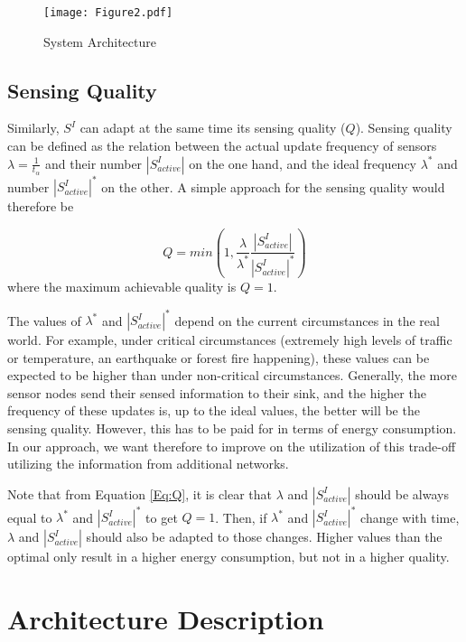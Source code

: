 \documentclass[onecolumn]{jaise2e}
\begin{document}
\begin{figure*}[!th]
\centering
\texttt{[image: Figure2.pdf]}  
\caption{System Architecture}
\label{fig:System_Architecture}
\end{figure*}


\subsection{Sensing Quality}

Similarly, $S^I$ can adapt at the same time its sensing quality ($Q$). Sensing quality can be defined as the relation between the actual update frequency of sensors $\lambda = \frac{1}{t_\alpha}$ and their number $|S^{I}_{active}|$ on the one hand, and the ideal frequency $\lambda^{\ast}$ and number $|S^{I}_{active}|^{\ast}$ on the other. A simple approach for the sensing quality would therefore be

\begin{equation}\label{Eq:Q}
Q = min \left(1, \frac{\lambda}{\lambda^{\ast}} \frac{|S^{I}_{active}|}{|S^{I}_{active}|^{\ast}}\right)
\end{equation}
where the maximum achievable quality is $Q=1$. 

The values of $\lambda^{\ast}$ and $|S^{I}_{active}|^{\ast}$ depend on the current circumstances in the real world. For example, under critical circumstances (extremely high levels of traffic or temperature, an earthquake or forest fire happening), these values can be expected to be higher than under non-critical circumstances. Generally, the more sensor nodes send their sensed information to their sink, and the higher the frequency of these updates is, up to the ideal values, the better will be the sensing quality. However, this has to be paid for in terms of energy consumption. In our approach, we want therefore to improve on the utilization of this trade-off utilizing the information from additional networks.

Note that from Equation \ref{Eq:Q}, it is clear that $\lambda$ and $|S^{I}_{active}|$ should be always equal to $\lambda^{\ast}$ and $|S^{I}_{active}|^{\ast}$ to get $Q=1$. Then, if $\lambda^{\ast}$ and $|S^{I}_{active}|^{\ast}$ change with time, $\lambda$ and $|S^{I}_{active}|$ should also be adapted to those changes. Higher values than the optimal only result in a higher energy consumption, but not in a higher quality.
 





\section{Architecture Description}\label{sec:arch}
\end{document}
